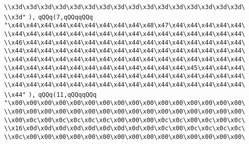 \verb|\\x3d\x3d\x3d\x3d\x3d\x3d\x3d\x3d\x3d\x3d\x3d\x3d\x3d\x3d\x3d\x3d\|\newline
\verb|\\x3d"|\newline
\verb|),|\newline
\verb|qQQq(7,qQQqqQQq|\newline
\verb|"\x44\x44\x44\x44\x44\x44\x44\x44\x44\x48\x47\x44\x44\x44\x44\x44\|\newline
\verb|\\x44\x44\x44\x44\x44\x44\x44\x44\x44\x44\x44\x44\x44\x44\x44\x44\|\newline
\verb|\\x46\x44\x44\x44\x44\x44\x44\x44\x44\x44\x44\x44\x44\x44\x44\x44\|\newline
\verb|\\x44\x44\x44\x44\x44\x44\x44\x44\x44\x44\x44\x44\x44\x44\x44\x44\|\newline
\verb|\\x44\x44\x44\x44\x44\x44\x44\x44\x44\x44\x44\x44\x44\x44\x44\x44\|\newline
\verb|\\x44\x44\x44\x44\x44\x44\x44\x44\x44\x44\x44\x44\x45\x44\x44\x44\|\newline
\verb|\\x44\x44\x44\x44\x44\x44\x44\x44\x44\x44\x44\x44\x44\x44\x44\x44\|\newline
\verb|\\x44\x44\x44\x44\x44\x44\x44\x44\x44\x44\x44\x44\x44\x44\x44\x44\|\newline
\verb|\\x44"|\newline
\verb|),|\newline
\verb|qQQq(11,qQQqqQQq|\newline
\verb|"\x00\x00\x00\x00\x00\x00\x00\x00\x00\x00\x00\x00\x00\x00\x00\x00\|\newline
\verb|\\x00\x00\x00\x00\x00\x00\x00\x00\x00\x00\x00\x00\x00\x00\x00\x00\|\newline
\verb|\\x00\x0c\x00\x0c\x0c\x0c\x0c\x00\x00\x00\x0c\x0c\x00\x0c\x00\x0c\|\newline
\verb|\\x16\x0d\x0d\x0d\x0d\x0d\x0d\x0d\x0d\x0d\x0c\x00\x0c\x0c\x0c\x0c\|\newline
\verb|\\x0c\x00\x00\x00\x00\x00\x00\x00\x00\x00\x00\x00\x00\x00\x00\x00\|\newline
